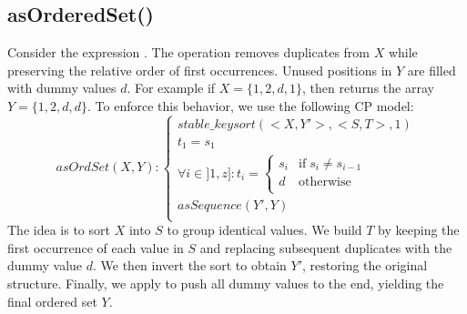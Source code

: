 


\subsection{asOrderedSet()}
\smallskip
\noindent
\label{ssec:asOrderedSet}
Consider the expression . The  operation removes duplicates from $X$ while preserving the relative order of first occurrences. Unused positions in $Y$ are filled with dummy values $d$. For example if $X=\{1,2,d,1\}$, then  returns the array $Y=\{1,2,d,d\}$. To enforce this behavior, we use the following CP model: 
\begin{equation}\label{csp:ordseq_XY}
asOrdSet(X,Y):
\begin{cases}
\mathit{stable\_keysort}(<X,Y'>,<S,T>,1) \\
t_1=s_1\\
\forall i \in ]1,z] : t_i = 
\begin{cases}
    s_i &\text{if}\; s_i\neq s_{i-1}\\
    d &\text{otherwise} \\
\end{cases}\\
asSequence(Y',Y)\\
\end{cases}
\end{equation}
The idea is to sort $X$ into $S$ to group identical values. We build $T$ by keeping the first occurrence of each value in $S$ and replacing subsequent duplicates with the dummy value $d$. We then invert the sort to obtain $Y'$, restoring the original structure. Finally, we apply  to push all dummy values to the end, yielding the final ordered set $Y$.

